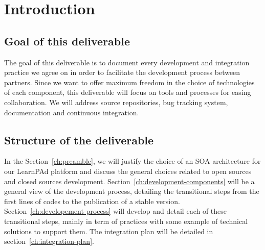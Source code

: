 \chapter{Introduction}
\label{ch:introduction}

\section{Goal of this deliverable}
\label{sec:goal-of-this-deliverable}

The goal of this deliverable is to document every development and integration practice we agree on in order to facilitate the development process between partners.  Since we want to offer maximum freedom in the choice of technologies of each component, this deliverable will focus on tools and processes for easing collaboration.  We will address source repositories, bug tracking system, documentation and continuous integration.

\section{Structure of the deliverable}
\label{sec:structure-of-the-deliverable}

In the Section~\ref{ch:preamble}, we will justify the choice of an SOA architecture for our LearnPAd platform and discuss the general choices related to open sources and closed sources development.  Section~\ref{ch:development-components} will be a general view of the development process, detailing the transitional steps from the first lines of codes to the publication of a stable version.  Section~\ref{ch:developement-process} will develop and detail each of these transitional steps, mainly in term of practices with some example of technical solutions to support them.  The integration plan will be detailed in section~\ref{ch:integration-plan}.

